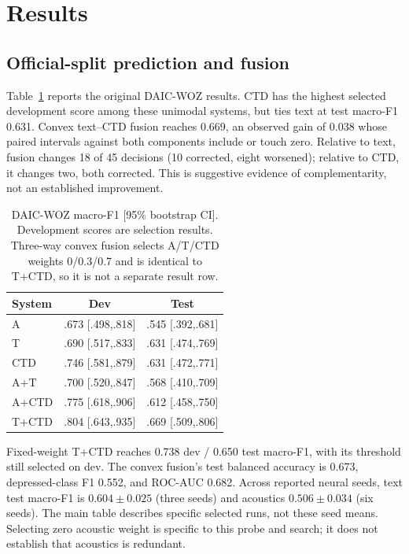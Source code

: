 \documentclass{article}
\begin{document}
\section{Results}
\label{sec:results}
\subsection{Official-split prediction and fusion}
Table~\ref{tab:results} reports the original DAIC-WOZ results. CTD has the highest selected development score among these unimodal systems, but ties text at test macro-F1 0.631. Convex text--CTD fusion reaches 0.669, an observed gain of 0.038 whose paired intervals against both components include or touch zero. Relative to text, fusion changes 18 of 45 decisions (10 corrected, eight worsened); relative to CTD, it changes two, both corrected. This is suggestive evidence of complementarity, not an established improvement.

\begin{table}[t]
\centering
\caption{DAIC-WOZ macro-F1 [95\% bootstrap CI]. Development scores are selection results. Three-way convex fusion selects A/T/CTD weights 0/0.3/0.7 and is identical to T+CTD, so it is not a separate result row.}
\label{tab:results}
\small
\begin{tabular}{lcc}
\toprule
System & Dev & Test\\
\midrule
A & .673 [.498,.818] & .545 [.392,.681]\\
T & .690 [.517,.833] & .631 [.474,.769]\\
CTD & .746 [.581,.879] & .631 [.472,.771]\\
A+T & .700 [.520,.847] & .568 [.410,.709]\\
A+CTD & .775 [.618,.906] & .612 [.458,.750]\\
T+CTD & .804 [.643,.935] & .669 [.509,.806]\\
\bottomrule
\end{tabular}
\end{table}

Fixed-weight T+CTD reaches 0.738 dev / 0.650 test macro-F1, with its threshold still selected on dev. The convex fusion's test balanced accuracy is 0.673, depressed-class F1 0.552, and ROC-AUC 0.682. Across reported neural seeds, text test macro-F1 is $0.604\pm0.025$ (three seeds) and acoustics $0.506\pm0.034$ (six seeds). The main table describes specific selected runs, not these seed means. Selecting zero acoustic weight is specific to this probe and search; it does not establish that acoustics is redundant.
\end{document}
